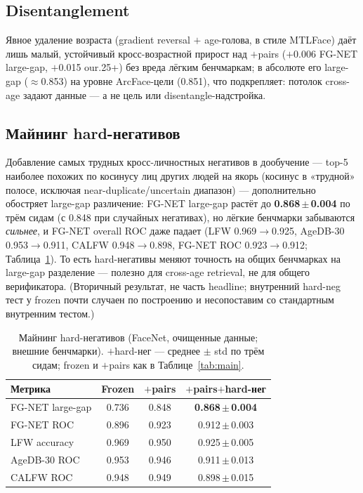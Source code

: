 \documentclass[journal]{IEEEtran}
\begin{document}
\subsection{Disentanglement}\label{sec:res-disentangle}
Явное удаление возраста (gradient reversal $+$ age-голова, в стиле MTLFace) даёт лишь малый, устойчивый кросс-возрастной прирост над $+$pairs ($+$0.006 FG-NET large-gap, $+$0.015 our.25+) без вреда лёгким бенчмаркам; в абсолюте его large-gap ($\approx$0.853) на уровне ArcFace-цели (0.851), что подкрепляет: потолок cross-age задают данные --- а не цель или disentangle-надстройка.

\subsection{Майнинг hard-негативов}\label{sec:res-hardneg}
Добавление самых трудных кросс-личностных негативов в дообучение --- top-5 наиболее похожих по косинусу лиц других людей на якорь (косинус в «трудной» полосе, исключая near-duplicate/uncertain диапазон) --- дополнительно обостряет large-gap различение: FG-NET large-gap растёт до \textbf{0.868\,$\pm$\,0.004} по трём сидам (с 0.848 при случайных негативах), но лёгкие бенчмарки забываются \emph{сильнее}, и FG-NET overall ROC даже падает (LFW 0.969$\to$0.925, AgeDB-30 0.953$\to$0.911, CALFW 0.948$\to$0.898, FG-NET ROC 0.923$\to$0.912; Таблица~\ref{tab:hardneg}). То есть hard-негативы меняют точность на общих бенчмарках на large-gap разделение --- полезно для cross-age retrieval, не для общего верификатора. (Вторичный результат, не часть headline; внутренний hard-neg тест у frozen почти случаен по построению и несопоставим со стандартным внутренним тестом.)

\begin{table}[!t]
\renewcommand{\arraystretch}{1.2}
\caption{Майнинг hard-негативов (FaceNet, очищенные данные; внешние бенчмарки). $+$hard-нег --- среднее $\pm$ std по трём сидам; frozen и $+$pairs как в Таблице~\ref{tab:main}.}
\label{tab:hardneg}
\centering
\footnotesize
\setlength{\tabcolsep}{4pt}%
\begin{tabular}{@{}lccc@{}}
\toprule
Метрика & Frozen & $+$pairs & $+$pairs$+$hard-нег \\
\midrule
FG-NET large-gap & 0.736 & 0.848 & \textbf{0.868\,$\pm$\,0.004} \\
FG-NET ROC & 0.896 & 0.923 & 0.912\,$\pm$\,0.003 \\
LFW accuracy & 0.969 & 0.950 & 0.925\,$\pm$\,0.005 \\
AgeDB-30 ROC & 0.953 & 0.946 & 0.911\,$\pm$\,0.013 \\
CALFW ROC & 0.948 & 0.949 & 0.898\,$\pm$\,0.015 \\
\bottomrule
\end{tabular}
\end{table}
\end{document}
